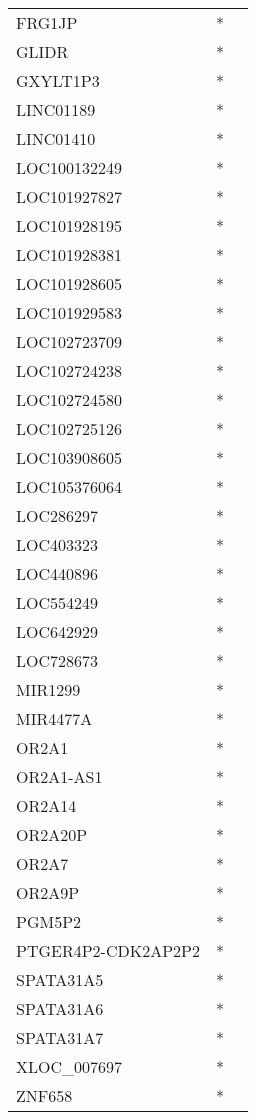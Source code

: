\begin{longtable}{lcc}
FRG1JP             &  * &         \\
GLIDR              &  * &         \\
GXYLT1P3           &  * &         \\
LINC01189          &  * &         \\
LINC01410          &  * &         \\
LOC100132249       &  * &         \\
LOC101927827       &  * &         \\
LOC101928195       &  * &         \\
LOC101928381       &  * &         \\
LOC101928605       &  * &         \\
LOC101929583       &  * &         \\
LOC102723709       &  * &         \\
LOC102724238       &  * &         \\
LOC102724580       &  * &         \\
LOC102725126       &  * &         \\
LOC103908605       &  * &         \\
LOC105376064       &  * &         \\
LOC286297          &  * &         \\
LOC403323          &  * &         \\
LOC440896          &  * &         \\
LOC554249          &  * &         \\
LOC642929          &  * &         \\
LOC728673          &  * &         \\
MIR1299            &  * &         \\
MIR4477A           &  * &         \\
OR2A1              &  * &         \\
OR2A1-AS1          &  * &         \\
OR2A14             &  * &         \\
OR2A20P            &  * &         \\
OR2A7              &  * &         \\
OR2A9P             &  * &         \\
PGM5P2             &  * &         \\
PTGER4P2-CDK2AP2P2 &  * &         \\
SPATA31A5          &  * &         \\
SPATA31A6          &  * &         \\
SPATA31A7          &  * &         \\
XLOC\_007697        &  * &         \\
ZNF658             &  * &         \\
\end{longtable}
